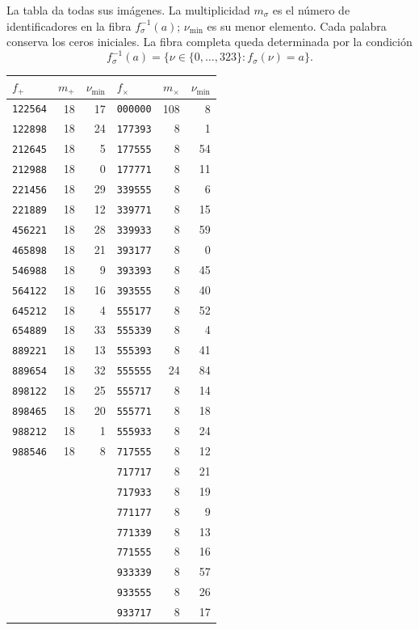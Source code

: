 La tabla da todas sus imágenes. La multiplicidad \(m_\sigma\) es el número
de identificadores en la fibra \(f_\sigma^{-1}(a)\); \(\nu_{\min}\) es su
menor elemento. Cada palabra conserva los ceros iniciales. La fibra completa
queda determinada por la condición
\[
 f_\sigma^{-1}(a)=\{\nu\in\{0,\ldots,323\}:f_\sigma(\nu)=a\}.
\]
\begin{center}\small
\begin{tabular}{@{}lrr@{\qquad}lrr@{}}
\toprule
\(f_+\) & \(m_+\) & \(\nu_{\min}\) & \(f_\times\) & \(m_\times\) & \(\nu_{\min}\)\\
\midrule
\texttt{122564} & 18 & 17 & \texttt{000000} & 108 & 8 \\
\texttt{122898} & 18 & 24 & \texttt{177393} & 8 & 1 \\
\texttt{212645} & 18 & 5 & \texttt{177555} & 8 & 54 \\
\texttt{212988} & 18 & 0 & \texttt{177771} & 8 & 11 \\
\texttt{221456} & 18 & 29 & \texttt{339555} & 8 & 6 \\
\texttt{221889} & 18 & 12 & \texttt{339771} & 8 & 15 \\
\texttt{456221} & 18 & 28 & \texttt{339933} & 8 & 59 \\
\texttt{465898} & 18 & 21 & \texttt{393177} & 8 & 0 \\
\texttt{546988} & 18 & 9 & \texttt{393393} & 8 & 45 \\
\texttt{564122} & 18 & 16 & \texttt{393555} & 8 & 40 \\
\texttt{645212} & 18 & 4 & \texttt{555177} & 8 & 52 \\
\texttt{654889} & 18 & 33 & \texttt{555339} & 8 & 4 \\
\texttt{889221} & 18 & 13 & \texttt{555393} & 8 & 41 \\
\texttt{889654} & 18 & 32 & \texttt{555555} & 24 & 84 \\
\texttt{898122} & 18 & 25 & \texttt{555717} & 8 & 14 \\
\texttt{898465} & 18 & 20 & \texttt{555771} & 8 & 18 \\
\texttt{988212} & 18 & 1 & \texttt{555933} & 8 & 24 \\
\texttt{988546} & 18 & 8 & \texttt{717555} & 8 & 12 \\
 & &  & \texttt{717717} & 8 & 21 \\
 & &  & \texttt{717933} & 8 & 19 \\
 & &  & \texttt{771177} & 8 & 9 \\
 & &  & \texttt{771339} & 8 & 13 \\
 & &  & \texttt{771555} & 8 & 16 \\
 & &  & \texttt{933339} & 8 & 57 \\
 & &  & \texttt{933555} & 8 & 26 \\
 & &  & \texttt{933717} & 8 & 17 \\
\bottomrule
\end{tabular}
\end{center}

